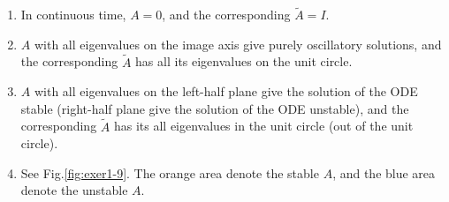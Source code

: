 \documentclass[11pt,a4paper]{report}
\theoremstyle{definition}\newtheorem{exercise}{Exercise}[chapter]
\begin{document}
\begin{answer}
\begin{enumerate}[label=(\alph*)]
    \item In continuous time, $A=0$, and the corresponding $\tilde A=I$.
    \item $A$ with all eigenvalues on the image axis give purely oscillatory solutions, and the corresponding $\tilde A$ has all its eigenvalues on the unit circle.
    \item $A$ with all eigenvalues on the left-half plane give the solution of the ODE stable (right-half plane give the solution of the ODE unstable), and the corresponding $\tilde A$ has its all eigenvalues in the unit circle (out of the unit circle).
    \item See Fig.\ref{fig:exer1-9}. The orange area denote the stable $A$, and the blue area denote the unstable $A$.
\end{enumerate}
\begin{figure}[htbp]
    \centering


    \begin{tikzpicture}[x=0.75pt,y=0.75pt,yscale=-1,xscale=1]
    

\end{tikzpicture}
\end{figure}
\end{answer}
\end{document}
